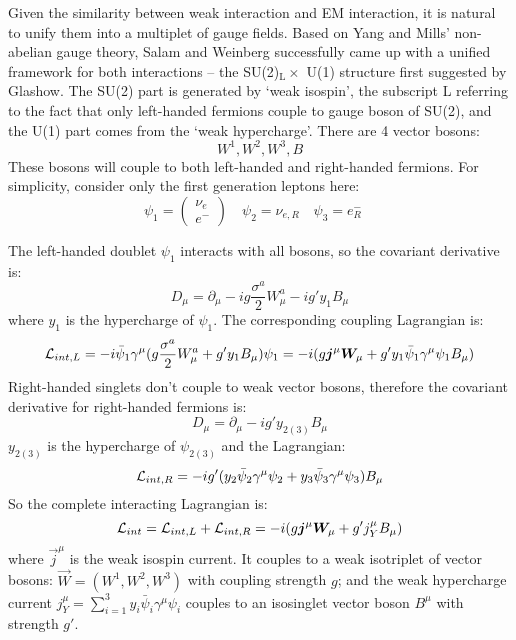 Given the similarity between weak interaction and EM interaction, it is natural
to unify them into a multiplet of gauge fields. Based on Yang and Mills' non-abelian 
gauge theory, Salam and Weinberg successfully came up with a unified 
framework for both interactions -- the SU(2)${}_\mathrm{L} \times$ U(1) structure first suggested 
by Glashow. The SU(2) part is generated by `weak isospin', the subscript L referring
to the fact that only left-handed fermions couple to gauge boson of SU(2), and the U(1)
part comes from the `weak hypercharge'. There are 4 vector bosons:
$$ W^1, W^2, W^3, B $$
These bosons will couple to both left-handed and right-handed fermions. For simplicity,
consider only the first generation leptons here:
\begin{equation}
    \psi_1 = \begin{pmatrix} \nu_e \\ e^-  \end{pmatrix}	\quad
    \psi_2 = \nu_{e,R}	\quad
    \psi_3 = e^-_R    \quad
\end{equation}

The left-handed doublet $\psi_1$ interacts with all bosons, 
so the covariant derivative is:
\begin{equation}
    D_\mu = \partial_\mu - ig\frac{\sigma^a}{2}W_\mu^a - ig'y_1B_\mu
\end{equation}
where $y_1$ is the hypercharge of $\psi_1$.
The corresponding coupling Lagrangian is:
\begin{equation}
    \mathcal{L}_{int, L} = -i\bar{\psi}_1 \gamma^\mu (g\frac{\sigma^a}{2}W^a_\mu + g'y_1B_\mu) \psi_1
	= -i(g\boldsymbol{j}^\mu\boldsymbol{W}_\mu + g'y_1\bar{\psi}_1\gamma^\mu\psi_1 B_\mu)
\end{equation}
Right-handed singlets don't couple to weak vector bosons, 
therefore the covariant derivative for right-handed fermions is:
\begin{equation}
    D_\mu = \partial_\mu - ig'y_{2(3)}B_\mu
\end{equation}
$y_{2(3)}$ is the hypercharge of $\psi_{2(3)}$
and the Lagrangian:
\begin{equation}
    \mathcal{L}_{int, R} = -ig'(y_2\bar{\psi}_2 \gamma^\mu \psi_2 + y_3\bar{\psi}_3\gamma^\mu \psi_3) B_\mu
\end{equation}
So the complete interacting Lagrangian is:
\begin{equation}
    \mathcal{L}_{int} = \mathcal{L}_{int, L} + \mathcal{L}_{int, R} = -i(g\boldsymbol{j}^\mu \boldsymbol{W}_\mu + g'j^\mu_{Y} B_\mu)
    \label{eq:GSW}
\end{equation}
where $\vec{j}^\mu$ is the weak isospin current. It couples to a weak 
isotriplet of vector bosons: $\vec{W} = (W^1, W^2, W^3)$ with
coupling strength $g$; and the weak hypercharge current 
$j^\mu_{Y} = \sum_{i=1}^3 y_i\bar{\psi}_i\gamma^\mu\psi_i$ couples to 
an isosinglet vector boson $B^\mu$ with strength $g'$. 

